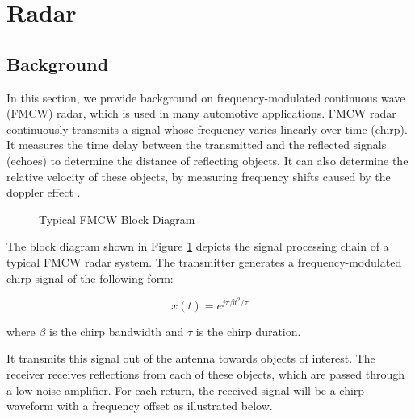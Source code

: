 \documentclass[conference]{IEEEtran}
\begin{document}
  \section {Radar}
   \subsection {Background}
   
In this section, we provide background on frequency-modulated continuous wave (FMCW) radar, which is used in many automotive applications. FMCW radar continuously transmits a signal whose frequency varies linearly over time (chirp). It measures the time delay between the transmitted and the reflected signals (echoes) to determine the distance of reflecting objects. It can also determine the relative velocity of these objects, by measuring frequency shifts caused by the doppler effect \cite{7455584}.

	\begin{figure}[H]
    		\centering
    		\caption{Typical FMCW Block Diagram \cite{9613183}}
    		\label{fig::fmcw_radar}
	\end{figure}
	
 The block diagram shown in Figure \ref{fig::fmcw_radar} depicts the signal processing chain of a typical FMCW radar system. The transmitter generates a frequency-modulated chirp signal of the following form:
 
 	\begin{equation}
 		x(t) = e^{j\pi{\beta}t^2/\tau}
 		\label{eq::chirp}
 	\end{equation}
 	
 	where $\beta$ is the chirp bandwidth and $\tau$ is the chirp duration.
 	
	It transmits this signal out of the antenna towards objects of interest. The receiver receives reflections from each of these objects, which are passed through a low noise amplifier. For each return, the received signal will be a chirp waveform with a frequency offset as illustrated below.
	
\end{document}
